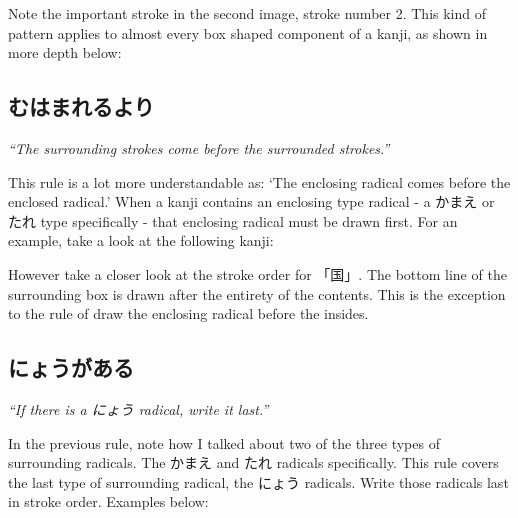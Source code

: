 Note the important stroke in the second image, stroke number 2. This kind of pattern applies to almost every box shaped component of a kanji, as shown in more depth below:

\begin{figure}[H]\label{fig:PR;漢字;書き順;左の縦線は右か下線の前}
	\centering
	
	\hspace{0.5in}
	
\end{figure}

\subsection*{むはまれるより}\label{ssec:PR;漢字;書き順;囲む線は囲まれる線より前}

\hspace*{24pt}\textit{``The surrounding strokes come before the surrounded strokes.''}

This rule is a lot more understandable as: `The enclosing radical comes before the enclosed radical.' When a kanji contains an enclosing type radical - a かまえ or たれ type specifically - that enclosing radical must be drawn first. For an example, take a look at the following kanji:

\begin{figure}[H]\label{fig:PR;漢字;書き順;囲む線は囲まれる線より前}
	\centering
	
	\hspace{0.5in}
	
\end{figure}

However take a closer look at the stroke order for 「国」. The bottom line of the surrounding box is drawn after the entirety of the contents. This is the exception to the rule of draw the enclosing radical before the insides.

\subsection*{にょうがある}\label{ssec:PR;漢字;書き順;にょうがある最後}

\hspace*{24pt}\textit{``If there is a にょう radical, write it last.''}

In the previous rule, note how I talked about two of the three types of surrounding radicals. The かまえ and たれ radicals specifically. This rule covers the last type of surrounding radical, the にょう radicals. Write those radicals last in stroke order. Examples below:

